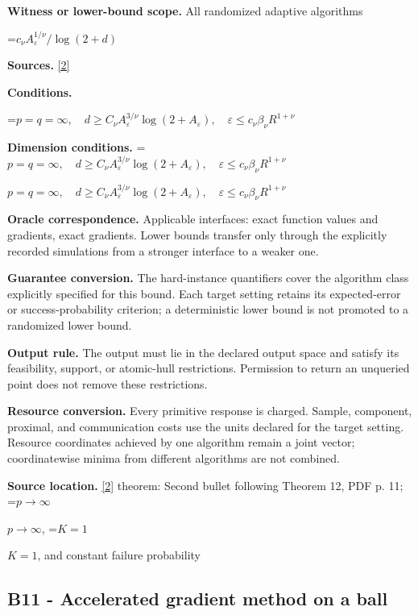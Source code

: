 \documentclass[10pt,a4paper]{article}
\newcommand{\AtlasMath}[1]{\par\begingroup\centering\setbox0=\hbox{$\displaystyle #1$}\ifdim\wd0>1.4\linewidth\typeout{ATLAS WIDE FORMULA: \the\wd0}\fi\ifdim\wd0>\linewidth\resizebox{\linewidth}{!}{\box0}\else\box0\fi\par\endgroup}
\newcommand{\AtlasInlineMath}[1]{\begingroup\setbox0=\hbox{$#1$}\ifdim\wd0>.4\linewidth\endgroup\AtlasMath{#1}\else\endgroup$#1$\fi}
\begin{document}
\textbf{Witness or lower-bound scope.} All randomized adaptive algorithms



\AtlasMath{c_\nu A_\varepsilon^{1/\nu}/\log(2+d)}


\textbf{Sources.} \href{https://proceedings.mlr.press/v99/diakonikolas19c/diakonikolas19c.pdf}{[2]}



\textbf{Conditions.}
\AtlasMath{p=q=\infty,\quad d\ge C_\nu A_\varepsilon^{3/\nu}\log(2+A_\varepsilon),\quad\varepsilon\le c_\nu\beta_\nu R^{1+\nu}}




\textbf{Dimension conditions.} \AtlasInlineMath{p=q=\infty,\quad d\ge C_\nu A_\varepsilon^{3/\nu}\log(2+A_\varepsilon),\quad\varepsilon\le c_\nu\beta_\nu R^{1+\nu}}



\textbf{Oracle correspondence.} Applicable interfaces: exact function values and gradients, exact gradients. Lower bounds transfer only through the explicitly recorded simulations from a stronger interface to a weaker one.



\textbf{Guarantee conversion.} The hard-instance quantifiers cover the algorithm class explicitly specified for this bound. Each target setting retains its expected-error or success-probability criterion; a deterministic lower bound is not promoted to a randomized lower bound.



\textbf{Output rule.} The output must lie in the declared output space and satisfy its feasibility, support, or atomic-hull restrictions. Permission to return an unqueried point does not remove these restrictions.



\textbf{Resource conversion.} Every primitive response is charged. Sample, component, proximal, and communication costs use the units declared for the target setting. Resource coordinates achieved by one algorithm remain a joint vector; coordinatewise minima from different algorithms are not combined.



\textbf{Source location.} \href{https://proceedings.mlr.press/v99/diakonikolas19c/diakonikolas19c.pdf}{[2]} theorem: Second bullet following Theorem 12, PDF p. 11; \AtlasInlineMath{p\to\infty}, \AtlasInlineMath{K=1}, and constant failure probability



\subsection{B11 - Accelerated gradient method on a ball}
\end{document}
